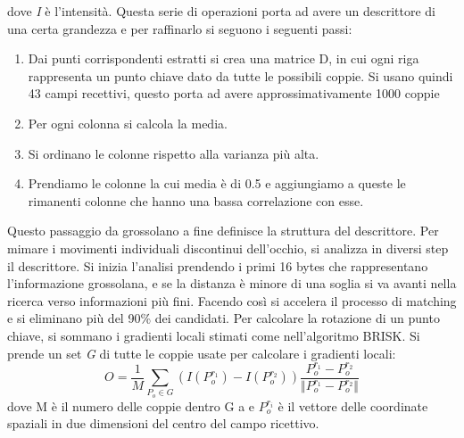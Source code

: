 \noindent dove \textit{I} è l'intensità. Questa serie di operazioni porta ad avere un descrittore di una certa grandezza e per raffinarlo si seguono i seguenti passi:
\begin{enumerate}
    \item Dai punti corrispondenti estratti si crea una matrice D, in cui ogni riga rappresenta un punto chiave dato da tutte le possibili coppie. Si usano quindi 43 campi recettivi, questo porta ad avere approssimativamente 1000 coppie
    \item Per ogni colonna si calcola la media.
    \item Si ordinano le colonne rispetto alla varianza più alta.
    \item Prendiamo le colonne la cui media è di 0.5 e aggiungiamo a queste le rimanenti colonne che hanno una bassa correlazione con esse.
\end{enumerate}
\noindent Questo passaggio da grossolano a fine definisce la struttura del descrittore. Per mimare i movimenti individuali discontinui dell'occhio, si analizza in diversi step il descrittore. Si inizia l'analisi prendendo i primi 16 bytes che rappresentano l'informazione grossolana, e se la distanza è minore di una soglia si va avanti nella ricerca verso informazioni più fini.
Facendo così si accelera il processo di matching e si eliminano più del 90\% dei candidati.
Per calcolare la rotazione di un punto chiave, si sommano i gradienti locali stimati come nell'algoritmo BRISK.
\noindent Si prende un set \textit{G} di tutte le coppie usate per calcolare i gradienti locali:
\begin{equation}
    O=\frac{1}{M} \sum_{P_{o}\in G}(I(P_{o}^{r_{1}})-I(P_{o}^{r_{2}}))\frac{P_{o}^{r_{1}}-P_{o}^{r_{2}}}{\Vert P_{o}^{r_{1}}-P_{o}^{r_{2}}\Vert}
\end{equation}
\noindent dove M è il numero delle coppie dentro G a e \(P_{o}^{r_{i}}\) è il vettore delle coordinate spaziali in due dimensioni del centro del campo ricettivo.